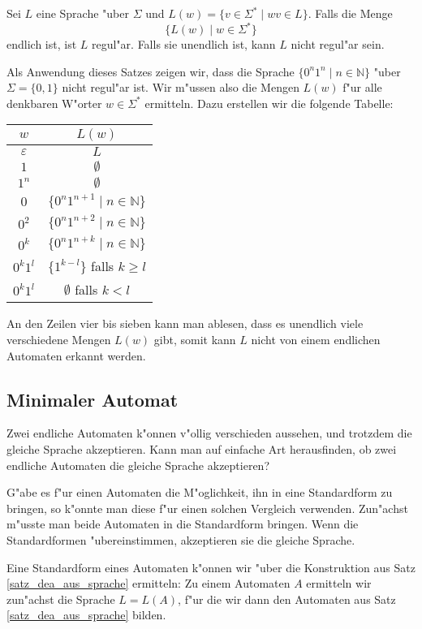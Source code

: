 \begin{satz}
Sei $L$ eine Sprache "uber $\Sigma$ und $L(w)=\{ v\in\Sigma^*\;|\; wv\in L\}$.
Falls die Menge 
\[
\{L(w)\;|\; w\in\Sigma^*\}
\]
endlich ist, ist $L$ regul"ar. Falls sie unendlich ist, kann $L$ nicht
regul"ar sein.
\end{satz}

Als Anwendung dieses Satzes zeigen wir, dass die Sprache
$\{ 0^n1^n \;|\; n\in\mathbb N\}$ "uber $\Sigma=\{0,1\}$
nicht regul"ar ist. Wir m"ussen also
die Mengen $L(w)$ f"ur alle denkbaren W"orter $w\in\Sigma^*$
ermitteln. Dazu erstellen wir die folgende Tabelle:
\begin{center}
\begin{tabular}{|c|c|}
\hline
$w$&$L(w)$\\
\hline
$\varepsilon$&$L$\\
$1$&$\emptyset$\\
$1^n$&$\emptyset$\\
$0$&$\{0^n1^{n+1}\;|\; n\in\mathbb N\}$\\
$0^2$&$\{0^n1^{n+2}\;|\; n\in\mathbb N\}$\\
$0^k$&$\{0^n1^{n+k}\;|\; n\in\mathbb N\}$\\
$0^k1^l$&$\{1^{k-l}\}$ falls $k\ge l$\\
$0^k1^l$&$\emptyset $ falls $k<l$\\
\hline
\end{tabular}
\end{center}
An den Zeilen vier bis sieben kann man ablesen, dass es unendlich
viele verschiedene Mengen $L(w)$ gibt, somit kann $L$ nicht von
einem endlichen Automaten erkannt werden.

\subsection{Minimaler Automat\label{regulaer:minimalautomat}}
Zwei endliche Automaten k"onnen v"ollig verschieden aussehen,
und trotzdem die gleiche Sprache akzeptieren. Kann man auf einfache
Art herausfinden, ob zwei endliche Automaten die gleiche Sprache
akzeptieren?

G"abe es f"ur einen Automaten die M"oglichkeit, ihn in eine Standardform
zu bringen, so k"onnte man diese f"ur einen solchen Vergleich verwenden.
Zun"achst m"usste man beide Automaten in die Standardform bringen. Wenn
die Standardformen "ubereinstimmen, akzeptieren sie die gleiche Sprache.

Eine Standardform eines Automaten k"onnen wir "uber die Konstruktion
aus Satz \ref{satz_dea_aus_sprache} ermitteln: Zu einem Automaten
$A$ ermitteln wir zun"achst die Sprache $L=L(A)$, f"ur die wir dann
den Automaten aus Satz \ref{satz_dea_aus_sprache} bilden.

